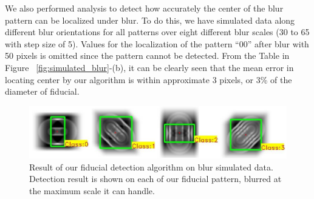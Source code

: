 \documentclass[runningheads]{llncs}
\begin{document}
We also performed analysis to detect how accurately the center of the blur pattern 
can be localized under blur.  To do this, we have simulated data along different blur
orientations for all patterns over eight different blur scales (30 to 65 with
step size of 5). Values for the localization of the pattern ``00'' after blur
with 50 pixels is omitted since the pattern cannot be detected. From the Table in Figure
~\ref{fig:simulated_blur}-(b), it can be clearly seen that the mean error in
locating center by our algorithm is within approximate 3 pixels, or 3\% of the
diameter of fiducial.

\begin{figure}
\includegraphics[width=\linewidth]{blur_maximum.pdf}
\caption{Result of our fiducial detection algorithm on blur simulated data.
Detection result is shown on each of our fiducial pattern, blurred at the
maximum scale it can handle.}
\label{fig:blur_maximum}
\end{figure}
\end{document}
